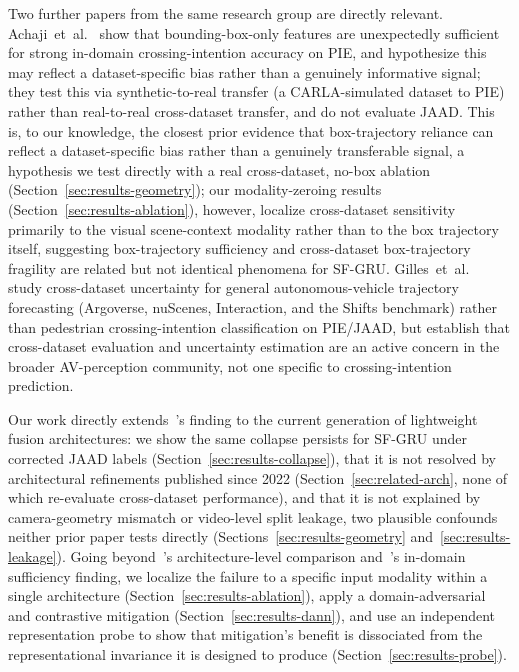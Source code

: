 Two further papers from the same research group are directly relevant.
Achaji~et~al.~\cite{achaji2022bbox} show that bounding-box-only features
are unexpectedly sufficient for strong in-domain crossing-intention
accuracy on PIE, and hypothesize this may reflect a dataset-specific
bias rather than a genuinely informative signal; they test this via
synthetic-to-real transfer (a CARLA-simulated dataset to PIE) rather
than real-to-real cross-dataset transfer, and do not evaluate JAAD. This
is, to our knowledge, the closest prior evidence that box-trajectory
reliance can reflect a dataset-specific bias rather than a genuinely
transferable signal, a hypothesis we test directly with a real
cross-dataset, no-box ablation (Section~\ref{sec:results-geometry}); our
modality-zeroing results (Section~\ref{sec:results-ablation}), however,
localize cross-dataset sensitivity primarily to the visual
scene-context modality rather than to the box trajectory itself,
suggesting box-trajectory sufficiency and cross-dataset box-trajectory
fragility are related but not identical phenomena for SF-GRU.
Gilles~et~al.~\cite{gilles2022uncertainty} study cross-dataset
uncertainty for general autonomous-vehicle trajectory forecasting
(Argoverse, nuScenes, Interaction, and the Shifts benchmark) rather than
pedestrian crossing-intention classification on PIE/JAAD, but establish
that cross-dataset evaluation and uncertainty estimation are an active
concern in the broader AV-perception community, not one specific to
crossing-intention prediction.

Our work directly extends~\cite{gesnouin2022}'s finding to the current
generation of lightweight fusion architectures: we show the same
collapse persists for SF-GRU under corrected JAAD labels
(Section~\ref{sec:results-collapse}), that it is not resolved by
architectural refinements published since 2022
(Section~\ref{sec:related-arch}, none of which re-evaluate cross-dataset
performance), and that it is not explained by camera-geometry mismatch
or video-level split leakage, two plausible confounds neither prior
paper tests directly (Sections~\ref{sec:results-geometry}
and~\ref{sec:results-leakage}). Going beyond~\cite{gesnouin2022}'s
architecture-level comparison and~\cite{achaji2022bbox}'s in-domain
sufficiency finding, we localize the failure to a specific input
modality within a single architecture
(Section~\ref{sec:results-ablation}), apply a domain-adversarial and
contrastive mitigation (Section~\ref{sec:results-dann}), and use an
independent representation probe to show that mitigation's benefit is
dissociated from the representational invariance it is designed to
produce (Section~\ref{sec:results-probe}).

